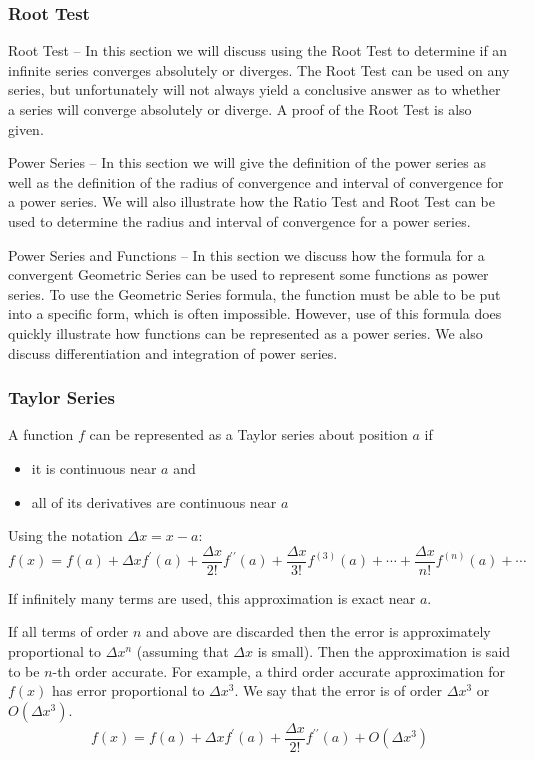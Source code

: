\subsubsection{Root Test}
Root Test – In this section we will discuss using the Root Test to determine if an infinite series converges absolutely or diverges. The Root Test can be used on any series, but unfortunately will not always yield a conclusive answer as to whether a series will converge absolutely or diverge. A proof of the Root Test is also given.


Power Series – In this section we will give the definition of the power series as well as the definition of the radius of convergence and interval of convergence for a power series. We will also illustrate how the Ratio Test and Root Test can be used to determine the radius and interval of convergence for a power series.

Power Series and Functions – In this section we discuss how the formula for a convergent Geometric Series can be used to represent some functions as power series. To use the Geometric Series formula, the function must be able to be put into a specific form, which is often impossible. However, use of this formula does quickly illustrate how functions can be represented as a power series. We also discuss differentiation and integration of power series.

\subsubsection{Taylor Series}
A function $f$ can be represented as a Taylor series about position $a$ if
\begin{itemize}
\item it is continuous near $a$ and
\item all of its derivatives are continuous near $a$
\end{itemize}

Using the notation $\Delta x = x-a$:
\[ f(x)=f(a)+\Delta xf^\prime(a)+\frac{\Delta x}{2!}f^{\prime\prime}(a) + \frac{\Delta x}{3!}f^{(3)}(a) + \cdots + \frac{\Delta x}{n!}f^{(n)}(a) + \cdots \]

If infinitely many terms are used, this approximation is exact near $a$.

If all terms of order $n$ and above are discarded then the error is approximately proportional to $\Delta x^n$ (assuming that $\Delta x$ is small). Then the approximation is said to be $n$-th order accurate. For example, a third order accurate approximation for $f(x)$ has error proportional to $\Delta x^3$. We say that  the error is of order $\Delta x^3$ or $O(\Delta x^3)$.
\[ f(x)=f(a)+\Delta xf^\prime(a)+\frac{\Delta x}{2!}f^{\prime\prime}(a) + O(\Delta x^3) \]


